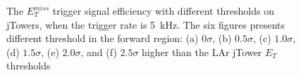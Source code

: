 \begin{figure}[ht]
	\caption{The $E^{miss}_{T}$ trigger signal efficiency with different thresholds on jTowers, when the trigger rate is 5~kHz. The six figures presents different threshold in the forward region: (a) $0\sigma$, (b) $0.5\sigma$, (c) $1.0\sigma$, (d) $1.5\sigma$, (e) $2.0\sigma$, and (f)  $2.5\sigma$ higher than the LAr jTower $E_{T}$ thresholds}
	\label{Fig:met_optimize}
\end{figure}

